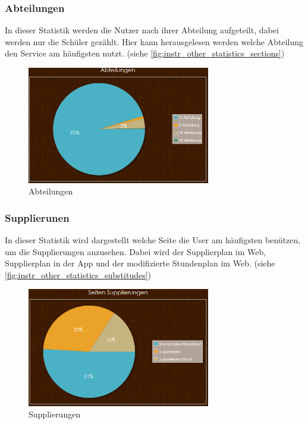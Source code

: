 \subsubsection{Abteilungen}
In dieser Statistik werden die Nutzer nach ihrer Abteilung aufgeteilt, dabei werden nur die Schüler gezählt. Hier kann herausgelesen werden welche Abteilung den Service am häufigsten nutzt. (siehe \autoref{fig:instr_other_statistics_sections})
\begin{figure}[H]
\centering
\includegraphics[keepaspectratio=true, width=8cm]{images/screenshots/statistics_sections.png}
\caption{Abteilungen}
\label{fig:instr_other_statistics_sections}
\end{figure}
\subsubsection{Supplierunen}
In dieser Statistik wird dargestellt welche Seite die User am häufigsten benützen, um die Supplierungen anzusehen. Dabei wird der Supplierplan im Web, Supplierplan in der App und der modifizierte Stundenplan im Web. (siehe \autoref{fig:instr_other_statistics_substitudes})
\begin{figure}[H]
\centering
\includegraphics[keepaspectratio=true, width=8cm]{images/screenshots/statistics_substitudes.png}
\caption{Supplierungen}
\label{fig:instr_other_statistics_substitudes}
\end{figure}
